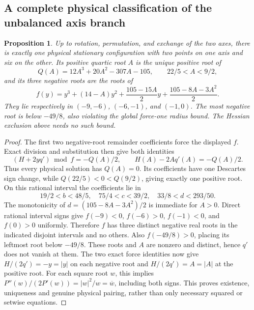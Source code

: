 \documentclass[11pt,a4paper]{article}
\newtheorem{proposition}[theorem]{Proposition}
\theoremstyle{remark}
\begin{document}
\subsection{A complete physical classification of the unbalanced axis branch}
\begin{proposition}\label{prop:eight-even-new-axis-classification}
Up to rotation, permutation, and exchange of the two axes, there is
exactly one physical stationary configuration with two points on one
axis and six on the other. Its positive quartic root $A$ is the unique
positive root of
\[
 Q(A)=12A^3+20A^2-307A-105,
 \qquad 22/5<A<9/2,
\]
and its three negative roots are the roots of
\[
 f(y)=y^3+(14-A)y^2+
       \frac{105-15A}{2}y+\frac{105-8A-3A^2}{2}.
\]
They lie respectively in $(-9,-6)$, $(-6,-1)$, and $(-1,0)$.
The most negative root is below $-49/8$, also violating the global
force-one radius bound. The Hessian exclusion above needs no such bound.
\end{proposition}
\begin{proof}
The first two negative-root remainder coefficients force the displayed
$f$. Exact division and substitution then give both identities
\[
 (H+2yq')\bmod f=-Q(A)/2,\qquad
 H(A)-2Aq'(A)=-Q(A)/2.
\]
Thus every physical solution has $Q(A)=0$. Its coefficients have one
Descartes sign change, while $Q(22/5)<0<Q(9/2)$, giving exactly one
positive root.
On this rational interval the coefficients lie in
\[
 19/2<b<48/5,\quad 75/4<c<39/2,\quad 33/8<d<293/50.
\]
The monotonicity of $d=(105-8A-3A^2)/2$ is immediate for $A>0$.
Direct rational interval signs give
$f(-9)<0$, $f(-6)>0$, $f(-1)<0$, and $f(0)>0$ uniformly.
Therefore $f$ has three distinct negative real roots in the indicated
disjoint intervals and no others. Also $f(-49/8)>0$, placing its
leftmost root below $-49/8$.
These roots and $A$ are nonzero and distinct, hence $q'$ does not
vanish at them. The two exact force identities now give
$H/(2q')=-y=|y|$ on each negative root and $H/(2q')=A=|A|$ at
the positive root. For each square root $w$, this implies
$P''(w)/(2P'(w))=|w|^2/w=\overline w$, including both signs.
This proves existence, uniqueness and genuine physical pairing,
rather than only necessary squared or setwise equations.
\end{proof}
\end{document}
